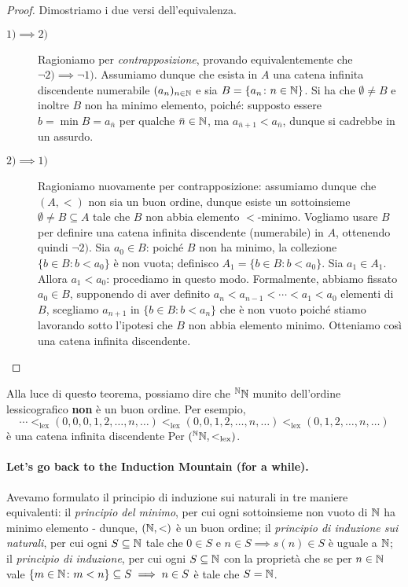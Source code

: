 \begin{proof}
  Dimostriamo i due versi dell'equivalenza.
  \begin{description}
    \item[\(1) \implies 2)\)] Ragioniamo per \emph{contrapposizione}, provando equivalentemente che \(\lnot 2) \implies \lnot 1)\). Assumiamo dunque che esista in \(A\) una catena infinita discendente numerabile \((a_n)_{n \in \mathbb{N}}\) e sia \(B = \lbrace a_n \colon n \in \mathbb{N} \rbrace\). Si ha che \(\emptyset \neq B\) e inoltre \(B\) non ha minimo elemento, poiché: supposto essere \(b = \min B = a_{\bar{n}}\) per qualche \(\bar{n} \in \mathbb{N}\), ma \(a_{\bar{n}+1} < a_{\bar{n}}\), dunque si cadrebbe in un assurdo.
    \item[\(2) \implies 1)\)] Ragioniamo nuovamente per contrapposizione: assumiamo dunque che \((A,<)\) non sia un buon ordine, dunque esiste un sottoinsieme \(\emptyset \neq B \subseteq A\) tale che \(B\) non abbia elemento \(<\)-minimo. Vogliamo usare \(B\) per definire una catena infinita discendente (numerabile) in \(A\), ottenendo quindi \(\lnot 2)\). Sia \(a_0 \in B\): poiché \(B\) non ha minimo, la collezione \(\lbrace b \in B \colon b < a_0\rbrace\) è non vuota; definisco \(A_1 = \lbrace b \in B \colon b < a_0\rbrace\). Sia \(a_1 \in A_1\). Allora \(a_1 < a_0\): procediamo in questo modo. Formalmente, abbiamo fissato \(a_0 \in B\), supponendo di aver definito \(a_n < a_{n-1} < \dotsb < a_1 < a_0\) elementi di \(B\), scegliamo \(a_{n+1}\) in \(\lbrace b \in B \colon b < a_n\rbrace\) che è non vuoto poiché stiamo lavorando sotto l'ipotesi che \(B\) non abbia elemento minimo. Otteniamo così una catena infinita discendente.
  \end{description}
\end{proof}
Alla luce di questo teorema, possiamo dire che \({}^{\mathbb{N}}\mathbb{N}\) munito dell'ordine lessicografico {\bf non} è un buon ordine. Per esempio,
\[
\dotsb <_{\mathrm{lex}} (0,0,0,1,2,\dots,n,\dots) <_{\mathrm{lex}} (0,0,1,2,\dots,n,\dots) <_{\mathrm{lex}} (0,1,2,\dots,n,\dots)
\]
è una catena infinita discendente Per \(({}^{\mathbb{N}}\mathbb{N},<_{\mathrm{lex}})\).

\paragraph{Let's go back to the Induction Mountain (for a while).} Avevamo formulato il principio di induzione sui naturali in tre maniere equivalenti: il \emph{principio del minimo}, per cui ogni sottoinsieme non vuoto di \(\mathbb{N}\) ha minimo elemento - dunque, \((\mathbb{N}, <)\) è un buon ordine; il \emph{principio di induzione sui naturali}, per cui ogni \(S \subseteq \mathbb{N}\) tale che \(0 \in S\) e \(n \in S \implies s(n) \in S\) è uguale a \(\mathbb{N}\); il \emph{principio di induzione}, per cui ogni \(S \subseteq \mathbb{N}\) con la proprietà che se per \(n \in \mathbb{N}\) vale \(\lbrace m \in \mathbb{N} \colon m < n \rbrace \subseteq S \implies n \in S\) è tale che \(S = \mathbb{N}\).

